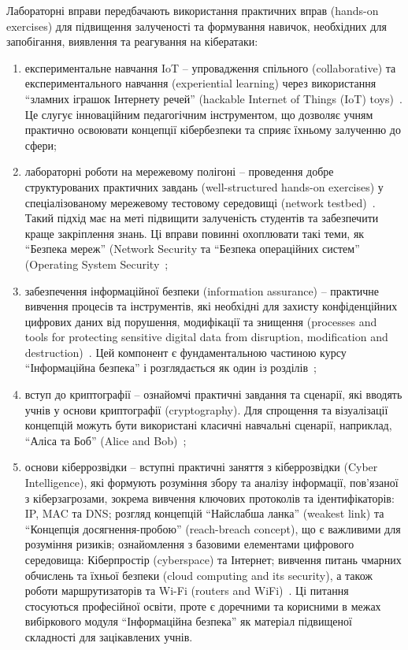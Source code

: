 Лабораторні вправи передбачають використання практичних вправ (hands-on exercises) для підвищення залученості та формування навичок, необхідних для запобігання, виявлення та реагування на кібератаки:
\begin{enumerate}[label=--] %
\item
експериментальне навчання IoT -- упровадження спільного (collaborative) та експериментального навчання (experiential learning) через використання ``зламних іграшок Інтернету речей'' (hackable Internet of Things (IoT) toys)~\cite{Gough2024394}. Це слугує інноваційним педагогічним інструментом, що дозволяє учням практично освоювати концепції кібербезпеки та сприяє їхньому залученню до сфери;
\item
лабораторні роботи на мережевому полігоні -- проведення добре структурованих практичних завдань (well-structured hands-on exercises) у спеціалізованому мережевому тестовому середовищі (network testbed)~\cite{Mirkovic2020866}. Такий підхід має на меті підвищити залученість студентів та забезпечити краще закріплення знань. Ці вправи повинні охоплювати такі теми, як ``Безпека мереж'' (Network Security та ``Безпека операційних систем'' (Operating System Security~\cite{Ismail2024};
\item
забезпечення інформаційної безпеки (information assurance) -- практичне вивчення процесів та інструментів, які необхідні для захисту конфіденційних цифрових даних від порушення, модифікації та знищення (processes and tools for protecting sensitive digital data from disruption, modification and destruction)~\cite{Jeyamala2023319}. Цей компонент є фундаментальною частиною курсу ``Інформаційна безпека'' і розглядається як один із розділів~\cite{Ismail2024};
\item
вступ до криптографії -- ознайомчі практичні завдання та сценарії, які вводять учнів у основи криптографії (cryptography). Для спрощення та візуалізації концепцій можуть бути використані класичні навчальні сценарії, наприклад, ``Аліса та Боб'' (Alice and Bob)~\cite{Ismail2024};
\item
основи кіберрозвідки -- вступні практичні заняття з кіберрозвідки (Cyber Intelligence), які формують розуміння збору та аналізу інформації, пов'язаної з кіберзагрозами, зокрема вивчення ключових протоколів та ідентифікаторів: IP, MAC та DNS; розгляд концепцій ``Найслабша ланка'' (weakest link) та ``Концепція досягнення-пробою'' (reach-breach concept), що є важливими для розуміння ризиків; ознайомлення з базовими елементами цифрового середовища: Кіберпростір (cyberspace) та Інтернет; вивчення питань чмарних обчислень та їхньої безпеки (cloud computing and its security), а також роботи маршрутизаторів та Wi-Fi (routers and WiFi)~\cite{Ismail2024}. Ці питання стосуються професійної освіти, проте є доречними та корисними в межах вибіркового модуля ``Інформаційна безпека'' як матеріал підвищеної складності для зацікавлених учнів.

\end{enumerate}

